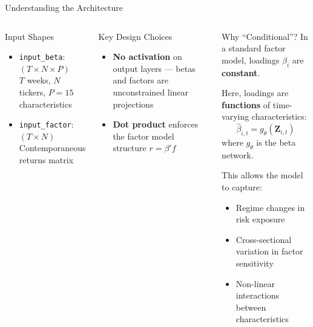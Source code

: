 \documentclass[aspectratio=169, 11pt]{beamer}
\begin{document}
\begin{frame}{Understanding the Architecture}
\small
\begin{columns}[T]
\begin{block}{Input Shapes}
\begin{itemize}
  \item \texttt{input\_beta}: $(T \times N \times P)$\\
        $T$ weeks, $N$ tickers, $P{=}15$ characteristics
  \item \texttt{input\_factor}: $(T \times N)$\\
        Contemporaneous returns matrix
\end{itemize}
\end{block}

\begin{block}{Key Design Choices}
\begin{itemize}
  \item \textbf{No activation} on output layers --- betas and factors are unconstrained linear projections
  \item \textbf{Dot product} enforces the factor model structure $r = \beta' f$
\end{itemize}
\end{block}

\begin{block}{Why ``Conditional''?}
In a standard factor model, loadings $\beta_i$ are \textbf{constant}.

\medskip

Here, loadings are \textbf{functions} of time-varying characteristics:
$$\hat\beta_{i,t} = g_\theta(\mathbf{Z}_{i,t})$$
where $g_\theta$ is the beta network.

\medskip

This allows the model to capture:
\begin{itemize}
  \item Regime changes in risk exposure
  \item Cross-sectional variation in factor sensitivity
  \item Non-linear interactions between characteristics
\end{itemize}
\end{block}
\end{columns}

\end{frame}
%
\end{document}
